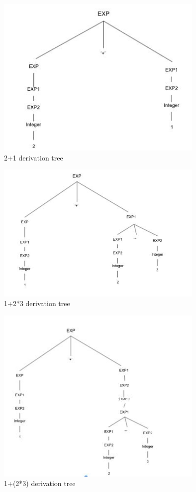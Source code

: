 \documentclass{article}
\theoremstyle{theorem}
\theoremstyle{definition}
\theoremstyle{remark}
\begin{document}
 \begin{figure}[htp]
    \centering
    \includegraphics[width=10cm]{1}
    \caption{ 2+1  derivation tree}
    \label{fig: 2+1}
\end{figure}
 \begin{figure}[htp]
    \centering
    \includegraphics[width=10cm]{2}
    \caption{1+2*3  derivation tree}
    \label{fig:1+2*3}
\end{figure}
 \begin{figure}[htp]
    \centering
    \includegraphics[width=10cm]{3}
    \caption{1+(2*3) derivation tree}
    \label{fig:1+(2*3)}
\end{figure}
\end{document}
